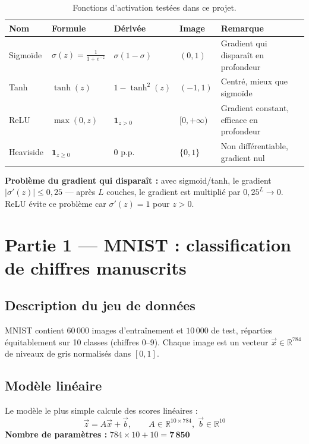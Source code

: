 \documentclass[a4paper,11pt]{article}
\begin{document}
\begin{table}[H]
\centering
\caption{Fonctions d'activation testées dans ce projet.}
\begin{tabular}{lllll}
\toprule
\textbf{Nom} & \textbf{Formule} & \textbf{Dérivée} & \textbf{Image} & \textbf{Remarque} \\
\midrule
Sigmoïde   & $\sigma(z)=\frac{1}{1+e^{-z}}$ & $\sigma(1-\sigma)$ & $(0,1)$ & Gradient qui disparaît en profondeur \\
Tanh       & $\tanh(z)$      & $1-\tanh^2(z)$  & $(-1,1)$ & Centré, mieux que sigmoïde \\
ReLU       & $\max(0,z)$     & $\mathbf{1}_{z>0}$ & $[0,+\infty)$ & Gradient constant, efficace en profondeur \\
Heaviside  & $\mathbf{1}_{z\geq0}$ & $0$ p.p. & $\{0,1\}$ & Non différentiable, gradient nul \\
\bottomrule
\end{tabular}
\end{table}

\noindent\textbf{Problème du gradient qui disparaît :} avec sigmoid/tanh, le gradient
$|\sigma'(z)| \leq 0{,}25$ — après $L$ couches, le gradient est multiplié par
$0{,}25^L \to 0$. ReLU évite ce problème car $\sigma'(z) = 1$ pour $z > 0$.

\section{Partie 1 — MNIST : classification de chiffres manuscrits}

\subsection{Description du jeu de données}

MNIST contient $60\,000$ images d'entraînement et $10\,000$ de test,
réparties équitablement sur 10 classes (chiffres 0--9).
Chaque image est un vecteur $\vec{x} \in \mathbb{R}^{784}$ de niveaux de gris normalisés dans $[0,1]$.

\subsection{Modèle linéaire}

Le modèle le plus simple calcule des scores linéaires :
\[
  \vec{z} = A\vec{x} + \vec{b}, \qquad A \in \mathbb{R}^{10 \times 784},\; \vec{b} \in \mathbb{R}^{10}
\]
\textbf{Nombre de paramètres :} $784 \times 10 + 10 = \mathbf{7\,850}$
\end{document}
